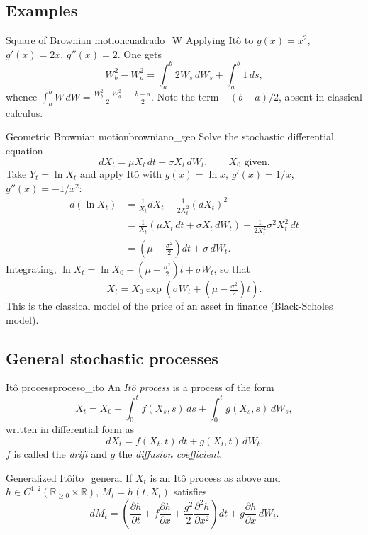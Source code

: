 \documentclass[11pt, a4paper]{article}
\begin{document}
\subsection{Examples}

\begin{ejemplo}{Square of Brownian motion}{cuadrado_W}
Applying Itô to $g(x) = x^2$, $g'(x) = 2x$, $g''(x) = 2$. One gets
$$ W_b^2 - W_a^2 = \int_a^b 2 W_s \, dW_s + \int_a^b 1 \, ds, $$
whence $\int_a^b W \, dW = \tfrac{W_b^2 - W_a^2}{2} - \tfrac{b - a}{2}$. Note the term
$-(b-a)/2$, absent in classical calculus.
\end{ejemplo}

\begin{ejemplo}{Geometric Brownian motion}{browniano_geo}
Solve the stochastic differential equation
$$ dX_t = \mu X_t \, dt + \sigma X_t \, dW_t, \qquad X_0 \text{ given}. $$
Take $Y_t = \ln X_t$ and apply Itô with $g(x) = \ln x$, $g'(x) = 1/x$, $g''(x) = -1/x^2$:
\begin{align*}
d(\ln X_t) &= \frac{1}{X_t} dX_t - \frac{1}{2 X_t^2} (dX_t)^2 \\
&= \frac{1}{X_t} (\mu X_t \, dt + \sigma X_t \, dW_t) - \frac{1}{2 X_t^2} \sigma^2 X_t^2 \, dt \\
&= \left(\mu - \tfrac{\sigma^2}{2}\right) dt + \sigma \, dW_t.
\end{align*}
Integrating, $\ln X_t = \ln X_0 + (\mu - \tfrac{\sigma^2}{2}) t + \sigma W_t$, so that
$$ X_t = X_0 \exp\!\left(\sigma W_t + \left(\mu - \tfrac{\sigma^2}{2}\right) t\right). $$
This is the classical model of the price of an asset in finance (Black-Scholes model).
\end{ejemplo}

\newpage

\subsection{General stochastic processes}

\begin{definicion}{Itô process}{proceso_ito}
An \emph{Itô process} is a process of the form
$$ X_t = X_0 + \int_0^t f(X_s, s) \, ds + \int_0^t g(X_s, s) \, dW_s, $$
written in differential form as
$$ dX_t = f(X_t, t) \, dt + g(X_t, t) \, dW_t. $$
$f$ is called the \emph{drift} and $g$ the \emph{diffusion coefficient}.
\end{definicion}

\begin{teorema}{Generalized Itô}{ito_general}
If $X_t$ is an Itô process as above and $h \in C^{1,2}(\mathbb{R}_{\ge 0} \times \mathbb{R})$,
$M_t = h(t, X_t)$ satisfies
$$ dM_t = \left(\frac{\partial h}{\partial t} + f \frac{\partial h}{\partial x} + \frac{g^2}{2}
\frac{\partial^2 h}{\partial x^2}\right) dt + g \frac{\partial h}{\partial x} \, dW_t. $$
\end{teorema}
\end{document}

